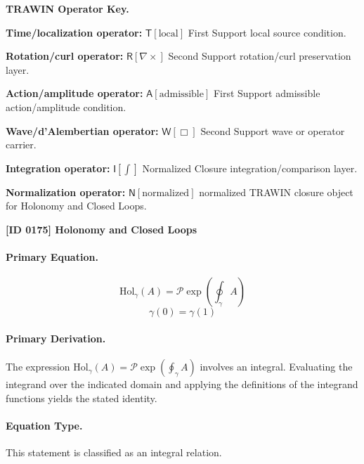 \par\vspace{0.45\baselineskip}
\noindent\begin{minipage}[t]{\linewidth}
\begingroup
\small
\raggedright
\textbf{TRAWIN Operator Key.}\par
\noindent\textbf{Time/localization operator:} $\mathsf{T}\!\left[\mathrm{local}\right]$ First Support local source condition.\par
\noindent\textbf{Rotation/curl operator:} $\mathsf{R}\!\left[\nabla\times\right]$ Second Support rotation/curl preservation layer.\par
\noindent\textbf{Action/amplitude operator:} $\mathsf{A}\!\left[\mathrm{admissible}\right]$ First Support admissible action/amplitude condition.\par
\noindent\textbf{Wave/d'Alembertian operator:} $\mathsf{W}\!\left[\Box\right]$ Second Support wave or operator carrier.\par
\noindent\textbf{Integration operator:} $\mathsf{I}\!\left[\int\right]$ Normalized Closure integration/comparison layer.\par
\noindent\textbf{Normalization operator:} $\mathsf{N}\!\left[\mathrm{normalized}\right]$ normalized TRAWIN closure object for Holonomy and Closed Loops.\par
\endgroup
\end{minipage}

\clearpage
\noindent\textbf{[ID 0175] Holonomy and Closed Loops}\par
\vspace{0.35em}
\paragraph{Primary Equation.}
\[
\mathrm{Hol}_\gamma(A)=\mathcal{P}\exp\!\left(\oint_\gamma A\right)
\]
\[
\gamma(0)=\gamma(1)
\]

\paragraph{Primary Derivation.}
The expression \( \mathrm{Hol}_\gamma(A)=\mathcal{P}\exp\!\left(\oint_\gamma A\right) \) involves an integral. Evaluating the integrand over the indicated domain and applying the definitions of the integrand functions yields the stated identity.
\paragraph{Equation Type.}
This statement is classified as an integral relation.

